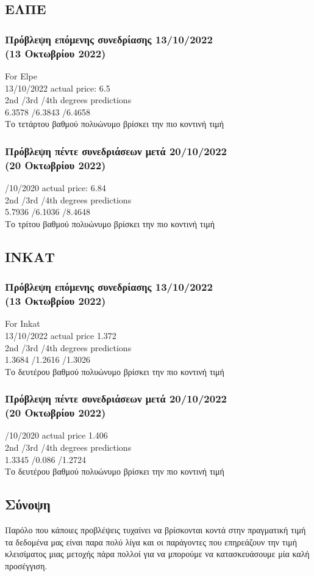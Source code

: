 \documentclass[a4paper,11pt]{article}
\newcommand{\gt}{\greektext}
\newcommand{\lt}{\latintext}
\begin{document}
\subsection{ΕΛΠΕ}
\subsubsection{Πρόβλεψη επόμενης συνεδρίασης 13/10/2022 \\ (13 Οκτωβρίου 2022)}
\lt 
For Elpe \\
13/10/2022 actual price: 6.5 \\
2nd /3rd /4th degrees predictions\\
6.3578 /6.3843 /6.4658 \gt \\
Το τετάρτου βαθμού πολυώνυμο βρίσκει την πιο κοντινή τιμή
\subsubsection{Πρόβλεψη πέντε συνεδριάσεων μετά 20/10/2022 \\ (20 Οκτωβρίου 2022)}
\lt 20/10/2020 actual price: 6.84 \\
2nd /3rd /4th degrees predictions\\
5.7936 /6.1036 /8.4648 \\
\gt
Το τρίτου βαθμού πολυώνυμο βρίσκει την πιο κοντινή τιμή

\subsection{ΙΝΚΑΤ}

\subsubsection{Πρόβλεψη επόμενης συνεδρίασης 13/10/2022 \\ (13 Οκτωβρίου 2022)}
\lt For Inkat \\
13/10/2022 actual price 1.372 \\
2nd /3rd /4th degrees predictions\\
1.3684 /1.2616 /1.3026 \\
\gt
Το δευτέρου βαθμού πολυώνυμο βρίσκει την πιο κοντινή τιμή

\subsubsection{Πρόβλεψη πέντε συνεδριάσεων μετά 20/10/2022 \\ (20 Οκτωβρίου 2022)}
\lt 
20/10/2020 actual price 1.406 \\
2nd /3rd /4th degrees predictions \\
1.3345 /0.086 /1.2724 \gt \\
Το δευτέρου βαθμού πολυώνυμο βρίσκει την πιο κοντινή τιμή

\subsection{Σύνοψη}
Παρόλο που κάποιες προβλέψεις τυχαίνει να βρίσκονται κοντά στην πραγματική τιμή τα δεδομένα μας είναι παρα πολύ λίγα και οι παράγοντες που επηρεάζουν την τιμή κλεισίματος μιας μετοχής πάρα πολλοί για να μπορούμε να κατασκευάσουμε μία καλή προσέγγιση.
\end{document}
